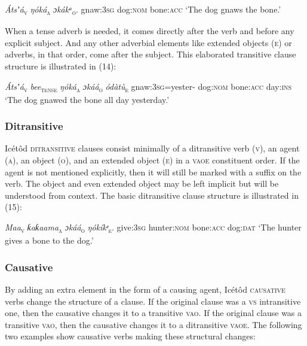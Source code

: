 \begin{table}
\textit{Átsʼá}\textsc{\textsubscript{v}}    \textit{ŋóká}\textsc{\textsubscript{a}}\textit{    ɔkákᵃ}\textsc{\textsubscript{o}}\textsc{.}
gnaw:\textsc{3sg}  dog:\textsc{nom}  bone:\textsc{acc}
‘The dog gnaws the bone.’


When a tense adverb is needed, it comes directly after the verb and before any explicit subject. And any other adverbial elements like extended objects (\textsc{e}) or adverbs, in that order, come after the subject. This elaborated transitive clause structure is illustrated in (14):



\textit{Átsʼá}\textsc{\textsubscript{v}}\textit{ bee}\textsc{\textsubscript{tense}}\textit{   ŋóká}\textsc{\textsubscript{a}}\textit{     ɔkáá}\textsc{\textsubscript{o}}\textit{         ódàtù}\textsc{\textsubscript{e}}
gnaw:\textsc{3sg}=yester-  dog:\textsc{nom}  bone:\textsc{acc  }day:\textsc{ins}
‘The dog gnawed the bone all day yesterday.’




\subsubsection{Ditransitive}

Icétôd \textsc{ditransitive} clauses consist minimally of a ditransitive verb (\textsc{v}), an agent (\textsc{a}), an object (\textsc{o}), and an extended object (\textsc{e}) in a \textsc{vaoe} constituent order. If the agent is not mentioned explicitly, then it will still be marked with a suffix on the verb. The object and even extended object may be left implicit but will be understood from context. The basic ditransitive clause structure is illustrated in (15):




\textit{Maa}\textsc{\textsubscript{v}}\textit{ }    \textit{ƙaƙaama}\textsc{\textsubscript{a}}\textit{   ɔkáá}\textsc{\textsubscript{o}}\textit{     ŋókíkᵉ}\textsc{\textsubscript{e}}.
give:\textsc{3sg}   hunter:\textsc{nom}   bone:\textsc{acc}   dog:\textsc{dat}
‘The hunter gives a bone to the dog.’




\subsubsection{Causative}

By adding an extra element in the form of a causing agent, Icétôd \textsc{causative} verbs change the structure of a clause. If the original clause was a \textsc{vs} intransitive one, then the causative changes it to a transitive \textsc{vao}. If the original clause was a transitive \textsc{vao}, then the causative changes it to a ditransitive \textsc{vaoe}. The following two examples show causative verbs making these structural changes:





\end{table}
